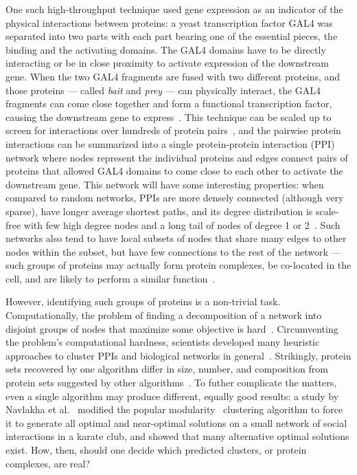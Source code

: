 One such high-throughput technique used gene expression as an indicator of the physical interactions between proteins: a yeast transcription factor GAL4 was separated into two parts with each part bearing one of the essential pieces, the binding and the activating domains. The GAL4 domains have to be directly interacting or be in close proximity to activate expression of the downstream gene. When the two GAL4 fragments are fused with two different proteins, and those proteins --- called \textit{bait} and \textit{prey} --- can physically interact, the GAL4 fragments can come close together and form a functional transcription factor, causing the downstream gene to express~\cite{Fields1989}. This technique can be scaled up to screen for interactions over hundreds of protein pairs~\cite{Ito2001}, and the pairwise protein interactions can be summarized into a single protein-protein interaction (PPI) network where nodes represent the individual proteins and edges connect pairs of proteins that allowed GAL4 domains to come close to each other to activate the downstream gene. This network will have some interesting properties: when compared to random networks, PPIs are more densely connected (although very sparse), have longer average shortest paths, and its degree distribution is scale-free with few high degree nodes and a long tail of nodes of degree 1 or 2~\cite{Zhu2007}. Such networks also tend to have local subsets of nodes that share many edges to other nodes within the subset, but have few connections to the rest of the network --- such groups of proteins may actually form protein complexes, be co-located in the cell, and are likely to perform a similar function~\cite{Sharan2007}.



However, identifying such groups of proteins is a non-trivial task. Computationally, the problem of finding a decomposition of a network into disjoint groups of nodes that maximize some objective is hard~\cite{Brandes2006b}. Circumventing the problem's computational hardness, scientists developed many heuristic approaches to cluster PPIs and biological networks in general~\cite{Sharan2007}. Strikingly, protein sets recovered by one algorithm differ in size, number, and composition from protein sets suggested by other algorithms~\cite{Brohee2006,Filippova2012}. To futher complicate the matters, even a single algorithm may produce different, equally good results: a study by Navlakha et al\@.~\cite{Navlakha10} modified the popular modularity~\cite{Girwan2002} clustering algorithm to force it to generate all optimal and near-optimal solutions on a small network of social interactions in a karate club, and showed that many alternative optimal solutions exist. How, then, should one decide which predicted clusters, or protein complexes, are real?

